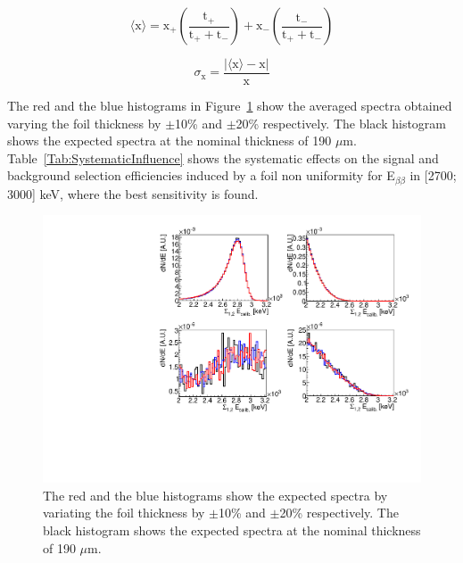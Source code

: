 \documentclass[main.tex]{subfiles}
\begin{document}
\begin{equation}
\langle \text{x} \rangle = \text{x}_+ \left( \frac{\text{t}_+}{\text{t}_+ + \text{t}_-}  \right) + \text{x}_- \left( \frac{\text{t}_-}{\text{t}_+ + \text{t}_-}  \right) 
\end{equation}


\begin{equation}
\sigma_\text{x} = \frac{|\langle \text{x}\rangle - \text{x}|}{\text{x}}
\end{equation}


\bigskip


\NI The red and the blue histograms in Figure~\ref{SpectrumThickness} show the averaged spectra obtained varying the foil thickness by $\pm$10\% and $\pm$20\% respectively. The black histogram shows the expected spectra at the nominal thickness of 190 $\mu$m. Table~\ref{Tab:SystematicInfluence} shows the systematic effects on the signal and background selection efficiencies induced by a foil non uniformity for E$_{\beta\beta}$ in [2700; 3000] keV, where the best sensitivity is found.



\begin{figure}[h!]
\centering
\includegraphics[scale=0.7]{pictures/Chap4/Syst.pdf}
\caption{The red and the blue histograms show the expected spectra by variating the foil thickness by $\pm$10\% and $\pm$20\% respectively. The black histogram shows the expected spectra at the nominal thickness of 190 $\mu$m.}
\label{SpectrumThickness}
\end{figure}
\end{document}
